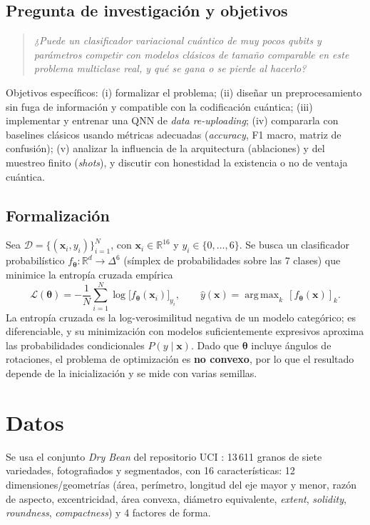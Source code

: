 \documentclass[11pt,letterpaper]{article}
\newcommand{\R}{\mathbb{R}}
\DeclareMathOperator*{\argmax}{arg\,max}
\begin{document}
\subsection{Pregunta de investigación y objetivos}
\begin{quote}
\emph{¿Puede un clasificador variacional cuántico de muy pocos qubits y parámetros competir con
modelos clásicos de tamaño comparable en este problema multiclase real, y qué se gana o se pierde
al hacerlo?}
\end{quote}
Objetivos específicos: (i) formalizar el problema; (ii) diseñar un preprocesamiento sin fuga de
información y compatible con la codificación cuántica; (iii) implementar y entrenar una QNN de
\emph{data re-uploading}; (iv) compararla con baselines clásicos usando métricas adecuadas
(\emph{accuracy}, F1 macro, matriz de confusión); (v) analizar la influencia de la arquitectura
(ablaciones) y del muestreo finito (\emph{shots}), y discutir con honestidad la existencia o no de
ventaja cuántica.

\subsection{Formalización}
Sea $\mathcal{D}=\{(\bm{x}_i,y_i)\}_{i=1}^{N}$, con $\bm{x}_i\in\R^{16}$ y
$y_i\in\{0,\dots,6\}$. Se busca un clasificador probabilístico
$f_{\bm\theta}:\R^{d}\to\Delta^{6}$ (símplex de probabilidades sobre las 7 clases) que minimice la
entropía cruzada empírica
\begin{equation}
\mathcal{L}(\bm\theta)= -\frac{1}{N}\sum_{i=1}^{N}\log\big[f_{\bm\theta}(\bm{x}_i)\big]_{y_i},
\qquad
\hat{y}(\bm{x})=\argmax_{k}\,[f_{\bm\theta}(\bm{x})]_k .
\label{eq:loss}
\end{equation}
La entropía cruzada es la log-verosimilitud negativa de un modelo categórico; es diferenciable, y
su minimización con modelos suficientemente expresivos aproxima las probabilidades condicionales
$P(y\mid\bm{x})$. Dado que $\bm\theta$ incluye ángulos de rotaciones, el problema de optimización
es \textbf{no convexo}, por lo que el resultado depende de la inicialización y se mide con varias
semillas.

\section{Datos}
Se usa el conjunto \emph{Dry Bean} del repositorio UCI \cite{koklu2020}: 13\,611 granos de siete
variedades, fotografiados y segmentados, con 16 características: 12 dimensiones/geometrías (área,
perímetro, longitud del eje mayor y menor, razón de aspecto, excentricidad, área convexa, diámetro
equivalente, \emph{extent}, \emph{solidity}, \emph{roundness}, \emph{compactness}) y 4 factores de
forma.
\end{document}
